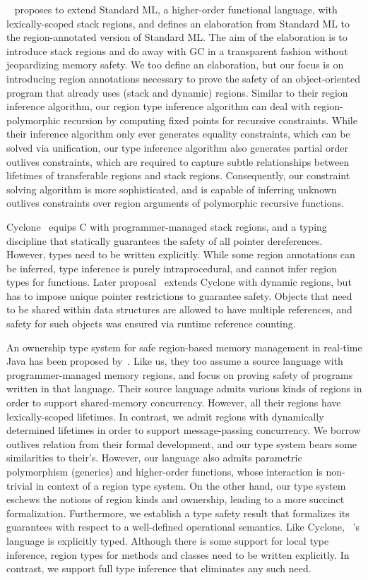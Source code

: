 ~\cite{tofte97} proposes to extend Standard ML, a higher-order
functional language, with lexically-scoped stack regions, and defines
an elaboration from Standard ML to the region-annotated version of
Standard ML. The aim of the elaboration is to introduce stack regions
and do away with GC in a transparent fashion without jeopardizing
memory safety. We too define an elaboration, but our focus is on
introducing region annotations necessary to prove the safety of an
object-oriented program that already uses (stack and dynamic) regions.
Similar to their region inference algorithm, our region type inference
algorithm can deal with region-polymorphic recursion by computing
fixed points for recursive constraints. While their inference
algorithm only ever generates equality constraints, which can be
solved via unification, our type inference algorithm also generates
partial order outlives constraints, which are required to capture
subtle relationships between lifetimes of transferable regions and
stack regions. Consequently, our constraint solving algorithm is more
sophisticated, and is capable of inferring unknown outlives
constraints over region arguments of polymorphic recursive functions.

Cyclone~\cite{cyclone02} equips C with programmer-managed stack
regions, and a typing discipline that statically guarantees the safety
of all pointer dereferences. However, types need to be written
explicitly. While some region annotations can be inferred, type
inference is purely intraprocedural, and cannot infer region types for
functions. Later proposal~\cite{cyclone04} extends Cyclone with
dynamic regions, but has to impose unique pointer restrictions to
guarantee safety. Objects that need to be shared within data
structures are allowed to have multiple references, and safety for
such objects was ensured via runtime reference counting.

An ownership type system for safe region-based memory management in
real-time Java has been proposed by~\cite{MIT03}. Like us, they too
assume a source language with programmer-managed memory regions, and
focus on proving safety of programs written in that language. Their
source language admits various kinds of regions in order to support
shared-memory concurrency. However, all their regions have
lexically-scoped lifetimes. In contrast, we admit regions with
dynamically determined lifetimes in order to support message-passing
concurrency. We borrow outlives relation from their formal
development, and our type system bears some similarities to their's.
However, our language also admits parametric polymorphism (generics)
and higher-order functions, whose interaction is non-trivial in
context of a region type system. On the other hand, our type system
eschews the notions of region kinds and ownership, leading to a more
succinct formalization. Furthermore, we establish a type safety result
that formalizes its guarantees with respect to a well-defined
operational semantics. Like Cyclone, ~\cite{MIT03}'s language is
explicitly typed. Although there is some support for local type
inference, region types for methods and classes need to be written
explicitly. In contrast, we support full type inference that
eliminates any such need.

